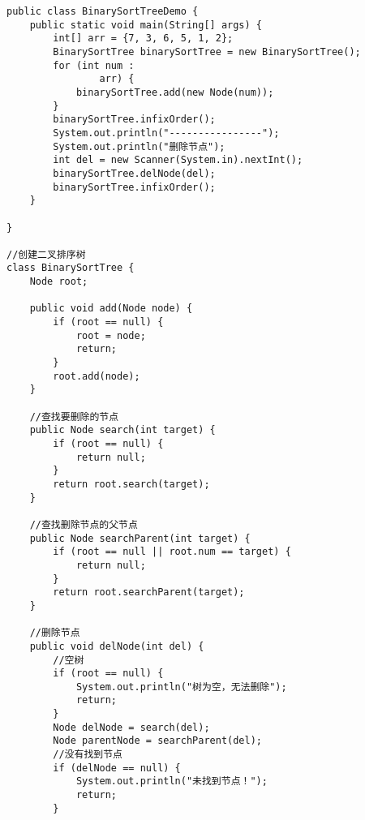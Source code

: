 \documentclass[a4paper]{report}
\begin{document}
\begin{lstlisting}
public class BinarySortTreeDemo {
    public static void main(String[] args) {
        int[] arr = {7, 3, 6, 5, 1, 2};
        BinarySortTree binarySortTree = new BinarySortTree();
        for (int num :
                arr) {
            binarySortTree.add(new Node(num));
        }
        binarySortTree.infixOrder();
        System.out.println("----------------");
        System.out.println("删除节点");
        int del = new Scanner(System.in).nextInt();
        binarySortTree.delNode(del);
        binarySortTree.infixOrder();
    }

}

//创建二叉排序树
class BinarySortTree {
    Node root;

    public void add(Node node) {
        if (root == null) {
            root = node;
            return;
        }
        root.add(node);
    }

    //查找要删除的节点
    public Node search(int target) {
        if (root == null) {
            return null;
        }
        return root.search(target);
    }

    //查找删除节点的父节点
    public Node searchParent(int target) {
        if (root == null || root.num == target) {
            return null;
        }
        return root.searchParent(target);
    }

    //删除节点
    public void delNode(int del) {
        //空树
        if (root == null) {
            System.out.println("树为空，无法删除");
            return;
        }
        Node delNode = search(del);
        Node parentNode = searchParent(del);
        //没有找到节点
        if (delNode == null) {
            System.out.println("未找到节点！");
            return;
        }


\end{lstlisting}
\end{document}
